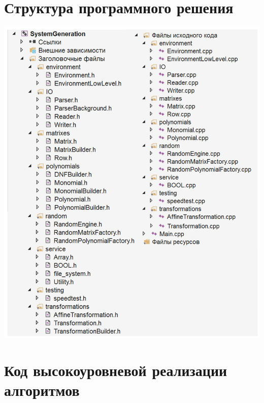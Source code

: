 \chapter{Структура программного решения}\label{appendix-extra-examples}
\includegraphics [scale=1.3]{my_folder/images/12}
\\ 

\chapter{Код высокоуровневой реализации алгоритмов}\label{appendix-extra-examples}

